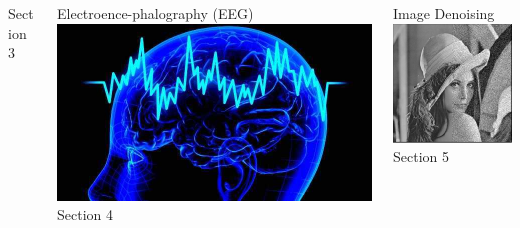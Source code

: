 \documentclass[10pt]{beamer}
\begin{document}
\begin{frame}[t]
\begin{columns}
\begin{column}{.2\linewidth}
        		\alert{Section 3}
        	\end{column}\hspace{-10pt}
        	\begin{column}{.2\linewidth}
        		Electroence-phalography (EEG)\\
        		\includegraphics[width = \linewidth]{eeg_pic.jpg}\\
        		\alert{Section 4}
        	\end{column}\hspace{-10pt}
        	\begin{column}{.2\linewidth}
        		Image Denoising\\
        		\includegraphics[width = \linewidth]{lena_pic.jpg}\\
        		\alert{Section 5}
        	\end{column}
        \end{columns}
  \end{frame}
\end{document}
